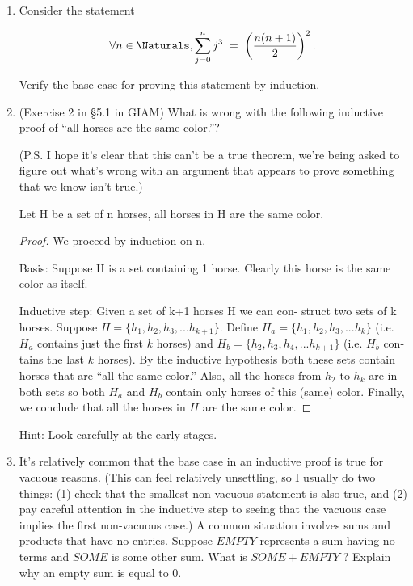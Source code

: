 \documentclass{amsart}
\begin{document}
\begin{enumerate}
\begin{enumerate}
\vfill

\end{enumerate}

\item Consider the statement

\[ \forall n \in \Naturals, \sum_{j=0}^{n} j^3 \; = \; \left( \frac{n(n + 1)}{2} \right)^2. \]

Verify the base case for proving this statement by induction.

\vfill


\newpage

\item (Exercise 2 in \S 5.1 in GIAM) What is wrong with the following
inductive proof of ``all horses are the same color.''?

(P.S. I hope it’s clear that this can’t be a true theorem, we’re
being asked to figure out what’s wrong with an argument that
appears to prove something that we know isn’t true.)

\begin{thm*}
 Let H be a set of n horses, all horses in H are the
same color.
\end{thm*}

\begin{proof}
We proceed by induction on n.

Basis: \newline
Suppose H is a set containing 1 horse. Clearly
this horse is the same color as itself.

Inductive step: \newline
Given a set of k+1 horses H we can con-
struct two sets of k horses. Suppose $H = \{h_1 , h_2 , h_3 , . . . h_{k+1} \}$.
Define $H_a = \{h_1 , h_2 , h_3 , . . . h_{k} \}$ (i.e. $H_a$ contains just the
first $k$ horses) and $H_b = \{h_2 , h_3 , h_4 , . . . h_{k+1} \}$ (i.e. $H_b$ con-
tains the last $k$ horses). By the inductive hypothesis both
these sets contain horses that are “all the same color.”
Also, all the horses from $h_2$ to $h_k$ are in both sets so both
$H_a$ and $H_b$ contain only horses of this (same) color. Finally, we conclude that all the horses in $H$ are the same
color.
\end{proof}


Hint: Look carefully at the early stages.

\vfill

\newpage

\item It’s relatively common that the base case in an inductive proof is
true for vacuous reasons. (This can feel relatively unsettling, so
I usually do two things: (1) check that the smallest non-vacuous
statement is also true, and (2) pay careful attention in the inductive
step to seeing that the vacuous case implies the first non-vacuous
case.) A common situation involves sums and products that have
no entries. Suppose $EMPTY$ represents a sum having no terms
and $SOME$ is some other sum. What is $SOME + EMPTY$ ?
Explain why an empty sum is equal to 0.


\end{enumerate}
\end{document}
